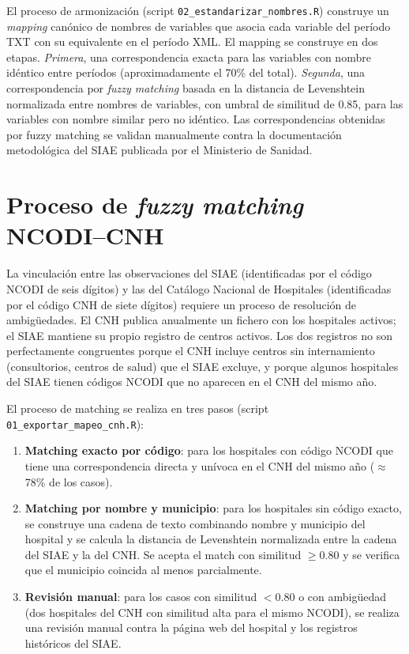 \documentclass[12pt, a4paper, twoside, openright]{book}
\theoremstyle{plain}
\theoremstyle{definition}
\theoremstyle{remark}
\begin{document}
El proceso de armonización (script \texttt{02\_estandarizar\_nombres.R}) construye un \textit{mapping} canónico de nombres de variables que asocia cada variable del período TXT con su equivalente en el período XML. El mapping se construye en dos etapas. \textit{Primera}, una correspondencia exacta para las variables con nombre idéntico entre períodos (aproximadamente el 70\% del total). \textit{Segunda}, una correspondencia por \textit{fuzzy matching} basada en la distancia de Levenshtein normalizada entre nombres de variables, con umbral de similitud de 0.85, para las variables con nombre similar pero no idéntico. Las correspondencias obtenidas por fuzzy matching se validan manualmente contra la documentación metodológica del SIAE publicada por el Ministerio de Sanidad.

\section{Proceso de \textit{fuzzy matching} NCODI--CNH}
\label{sec:fuzzy_matching_cnh}

La vinculación entre las observaciones del SIAE (identificadas por el código NCODI de seis dígitos) y las del Catálogo Nacional de Hospitales (identificadas por el código CNH de siete dígitos) requiere un proceso de resolución de ambigüedades. El CNH publica anualmente un fichero con los hospitales activos; el SIAE mantiene su propio registro de centros activos. Los dos registros no son perfectamente congruentes porque el CNH incluye centros sin internamiento (consultorios, centros de salud) que el SIAE excluye, y porque algunos hospitales del SIAE tienen códigos NCODI que no aparecen en el CNH del mismo año.

El proceso de matching se realiza en tres pasos (script \texttt{01\_exportar\_mapeo\_cnh.R}):

\begin{enumerate}
  \item \textbf{Matching exacto por código}: para los hospitales con código NCODI que tiene una correspondencia directa y unívoca en el CNH del mismo año ($\approx$ 78\% de los casos).
  \item \textbf{Matching por nombre y municipio}: para los hospitales sin código exacto, se construye una cadena de texto combinando nombre y municipio del hospital y se calcula la distancia de Levenshtein normalizada entre la cadena del SIAE y la del CNH. Se acepta el match con similitud $\geq 0.80$ y se verifica que el municipio coincida al menos parcialmente.
  \item \textbf{Revisión manual}: para los casos con similitud $< 0.80$ o con ambigüedad (dos hospitales del CNH con similitud alta para el mismo NCODI), se realiza una revisión manual contra la página web del hospital y los registros históricos del SIAE.
\end{enumerate}
\end{document}
